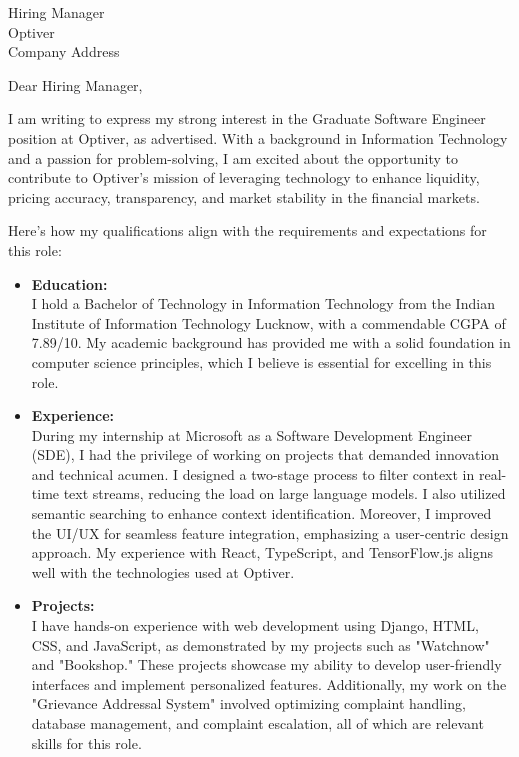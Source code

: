 \documentclass[a4paper,10pt]{letter}
\begin{document}
\begin{letter}{Hiring Manager \\ Optiver \\ Company Address}
\opening{Dear Hiring Manager,}

I am writing to express my strong interest in the Graduate Software Engineer position at Optiver, as advertised. With a background in Information Technology and a passion for problem-solving, I am excited about the opportunity to contribute to Optiver's mission of leveraging technology to enhance liquidity, pricing accuracy, transparency, and market stability in the financial markets.

Here's how my qualifications align with the requirements and expectations for this role:

\begin{itemize}[leftmargin=*]
\item \textbf{Education:} \\
I hold a Bachelor of Technology in Information Technology from the Indian Institute of Information Technology Lucknow, with a commendable CGPA of 7.89/10. My academic background has provided me with a solid foundation in computer science principles, which I believe is essential for excelling in this role.

\item \textbf{Experience:} \\
During my internship at Microsoft as a Software Development Engineer (SDE), I had the privilege of working on projects that demanded innovation and technical acumen. I designed a two-stage process to filter context in real-time text streams, reducing the load on large language models. I also utilized semantic searching to enhance context identification. Moreover, I improved the UI/UX for seamless feature integration, emphasizing a user-centric design approach. My experience with React, TypeScript, and TensorFlow.js aligns well with the technologies used at Optiver.

\item \textbf{Projects:} \\
I have hands-on experience with web development using Django, HTML, CSS, and JavaScript, as demonstrated by my projects such as "Watchnow" and "Bookshop." These projects showcase my ability to develop user-friendly interfaces and implement personalized features. Additionally, my work on the "Grievance Addressal System" involved optimizing complaint handling, database management, and complaint escalation, all of which are relevant skills for this role.


\end{itemize}
\end{letter}
\end{document}
